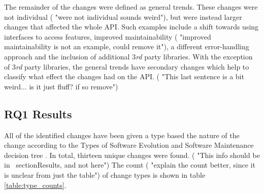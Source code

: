 \documentclass{sig-alternate}
\begin{document}
The remainder of the changes were defined as general trends. These changes were not individual ( "were not individual sounds weird"), but were instead larger changes that affected the whole API. Such examples include a shift towards using interfaces to access features, improved maintainability ( "improved maintainability is not an example, could remove it"), a different error-handling approach and the inclusion of additional 3\textit{rd} party libraries. With the exception of 3\textit{rd} party libraries, the general trends have secondary changes which help to classify what effect the changes had on the API. ( "This last sentence is a bit weird... is it just fluff? if so remove")



\subsection{RQ1 Results} \label{results_rq1}
All of the identified changes have been given a type based the nature of the change according to the Types of Software Evolution and Software Maintenance decision tree \cite{chapin2001types}. In total, thirteen unique changes were found. ( "This info should be in \ section{Results}, and not here") The count ( "explain the count better, since it is unclear from just the table") of change types is shown in table \ref{table:type_counts}.
\end{document}
